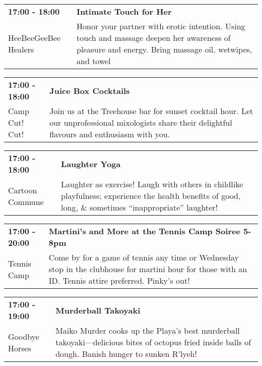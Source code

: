 \begin{tabular}{ p{1in} p{2.2in} }
    \textbf{17:00 - 18:00} & \textbf{Intimate Touch for Her} \\
    HeeBeeGeeBee Healers \newline  & Honor your partner with erotic intention. Using touch and massage deepen her awareness of pleasure and energy. Bring massage oil, wetwipes, and towel \\
    \hline 
\end{tabular}
    
\begin{tabular}{ p{1in} p{2.2in} }
    \textbf{17:00 - 18:00} & \textbf{Juice Box Cocktails} \\
    Camp Cut! Cut! \newline  & Join us at the Treehouse bar for sunset cocktail hour. Let our unprofessional mixologists share their  delightful flavours and enthusiasm with you. \\
    \hline 
\end{tabular}
    
\begin{tabular}{ p{1in} p{2.2in} }
    \textbf{17:00 - 18:00} & \textbf{Laughter Yoga} \\
    Cartoon Commune \newline  & Laughter as exercise! Laugh with others in childlike playfulness; experience the health benefits of good, long, \& sometimes ``inappropriate'' laughter! \\
    \hline 
\end{tabular}
    
\begin{tabular}{ p{1in} p{2.2in} }
    \textbf{17:00 - 20:00} & \textbf{Martini's and More at the Tennis Camp Soiree 5-8pm} \\
    Tennis Camp \newline  & Come by for a game of tennis any time or Wednesday stop in the clubhouse for martini hour for those with an ID. Tennis attire preferred. Pinky's out! \\
    \hline 
\end{tabular}
    
\begin{tabular}{ p{1in} p{2.2in} }
    \textbf{17:00 - 19:00} & \textbf{Murderball Takoyaki} \\
    Goodbye Horses \newline  & Maiko Murder cooks up the Playa's best murderball takoyaki---delicious bites of octopus fried inside balls of dough. Banish hunger to sunken R'lyeh! \\
    \hline 
\end{tabular}
    
